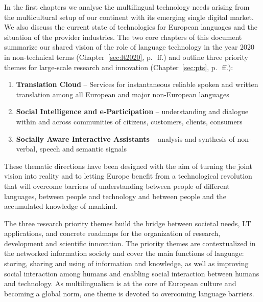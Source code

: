 \documentclass[10pt, plain]{../../metanetpaper}
\begin{document}
\begin{multicols}{2}
In the first chapters we analyse the multilingual technology needs arising from the multicultural setup of our continent with its emerging single digital market. We also discuss the current state of technologies for European languages and the situation of the provider industries. The two core chapters of this document summarize our shared vision of the role of language technology in the year 2020 in non-technical terms (Chapter~\ref{sec:lt2020}, p.~\pageref{sec:lt2020}\,ff.) and outline three priority themes for large-scale research and innovation (Chapter~\ref{sec:pts}, p.~\pageref{sec:pts}\,ff.):

\begin{enumerate}
\item \textbf{Translation Cloud} -- Services for instantaneous reliable spoken and written translation among all European and major non-European languages
\item \textbf{Social Intelligence and e-Participation} -- understanding and dialogue within and across communities of citizens, customers, clients, consumers
\item \textbf{Socially Aware Interactive Assistants} -- analysis and synthesis of non-verbal, speech and semantic signals
\end{enumerate}
 
These thematic directions have been designed with the aim of turning the joint vision into reality and to letting Europe benefit from a technological revolution that will overcome barriers of understanding between people of different languages, between people and technology and between people and the accumulated knowledge of mankind.

The three research priority themes build the bridge between societal needs, LT applications, and concrete roadmaps for the organization of research, development and scientific innovation. The priority themes are contextualized in the networked information society and cover the main functions of language: storing, sharing and using of information and knowledge, as well as improving social interaction among humans and enabling social interaction between humans and technology. As multilingualism is at the core of European culture and becoming a global norm, one theme is devoted to overcoming language barriers.


\end{multicols}
\end{document}
